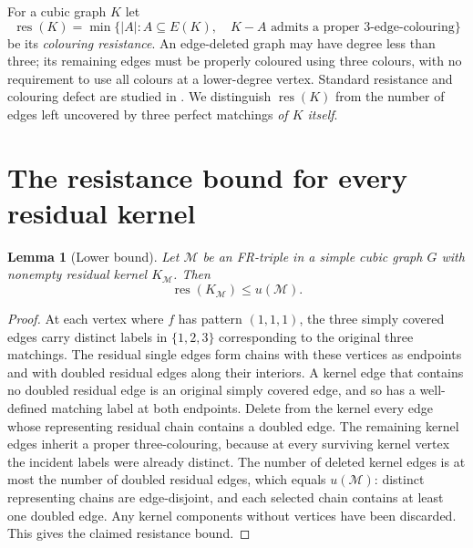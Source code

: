 \documentclass[11pt]{article}
\newtheorem{lemma}{Lemma}
\newcommand{\rc}{\operatorname{res}}
\begin{document}
For a cubic graph $K$ let
\[
\rc(K)=\min\bigl\{|A|:A\subseteq E(K),\quad K-A\text{ admits a proper }3\text{-edge-colouring}\bigr\}
\]
be its \emph{colouring resistance}. An edge-deleted graph may have degree less than three; its remaining edges must be properly coloured using three colours, with no requirement to use all colours at a lower-degree vertex. Standard resistance and colouring defect are studied in \cite{Allie26,Karabas24}. We distinguish $\rc(K)$ from the number of edges left uncovered by three perfect matchings \emph{of $K$ itself}.

\section{The resistance bound for every residual kernel}
\begin{lemma}[Lower bound]\label{lem:lower}
Let $\mathcal M$ be an FR-triple in a simple cubic graph $G$ with nonempty residual kernel $K_{\mathcal M}$. Then
\[
\rc(K_{\mathcal M})\le u(\mathcal M).
\]
\end{lemma}
\begin{proof}
At each vertex where $f$ has pattern $(1,1,1)$, the three simply covered edges carry distinct labels in $\{1,2,3\}$ corresponding to the original three matchings. The residual single edges form chains with these vertices as endpoints and with doubled residual edges along their interiors. A kernel edge that contains no doubled residual edge is an original simply covered edge, and so has a well-defined matching label at both endpoints. Delete from the kernel every edge whose representing residual chain contains a doubled edge. The remaining kernel edges inherit a proper three-colouring, because at every surviving kernel vertex the incident labels were already distinct. The number of deleted kernel edges is at most the number of doubled residual edges, which equals $u(\mathcal M)$: distinct representing chains are edge-disjoint, and each selected chain contains at least one doubled edge. Any kernel components without vertices have been discarded. This gives the claimed resistance bound.
\end{proof}
\end{document}
